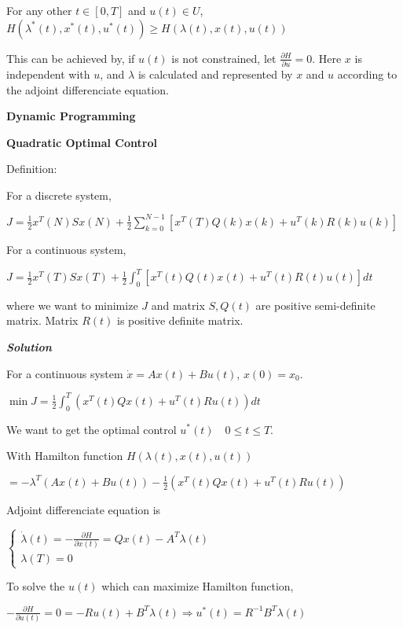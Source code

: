 \documentclass{article}
\newcommand{\bigtitle}[1]{
	\noindent
	\textbf{#1}
}
\newcommand{\smalltitle}[1]{
	\noindent
	\textbf{\textit{#1}}
}
\begin{document}
\begin{spacing}{1.2}
For any other $t \in [0, T]$ and $u(t) \in U$,
$H\left(\lambda^{*}(t), x^{*}(t), u^{*}(t)\right) \geq H\left(\lambda(t), x(t), u(t)\right)$

This can be achieved by, if $u(t)$ is not constrained, let $\frac{\partial H}{\partial u} = 0$. Here $x$ is independent with $u$, and $\lambda$ is calculated and represented by $x$ and $u$ according to the adjoint differenciate equation.



\bigtitle{Dynamic Programming}



\bigtitle{Quadratic Optimal Control}

Definition:

For a discrete system,

\noindent
$J=\frac{1}{2} x^{T}(N) S x(N)+\frac{1}{2} \sum_{k=0}^{N-1}\left[x^{T}(T) Q(k) x(k)+u^{T}(k) R(k) u(k)\right]$

For a continuous system,

\noindent
$J=\frac{1}{2} x^{T}(T) S x(T)+\frac{1}{2} \int_{0}^{T}\left[x^{T}(t) Q(t) x(t)+u^{T}(t) R(t) u(t)\right] d t$

where we want to minimize $J$ and matrix $S, Q(t)$ are positive semi-definite matrix. Matrix $R(t)$ is positive definite matrix.

\smalltitle{Solution}

For a continuous system $\dot{x}=A x(t)+B u(t)$, $x(0) = x_0$.

$\min J=\frac{1}{2} \int_{0}^{T}\left(x^{T}(t) Q x(t)+u^{T}(t) R u(t)\right) d t$

We want to get the optimal control $u^{*}(t) \quad 0 \leq t \leq T$.

With Hamilton function $H(\lambda(t), x(t), u(t))$

$=-\lambda^{T}(A x(t)+B u(t))-\frac{1}{2}\left(x^{T}(t) Q x(t)+u^{T}(t) R u(t)\right)$

Adjoint differenciate equation is 

$
\left\lbrace \begin{array}{ll}
\dot{\lambda}(t) = -\frac{\partial H}{\partial x(t)}=Q x(t)-A^{T} \lambda(t)\\
\lambda(T)=0
\end{array}
\right.
$

To solve the $u(t)$ which can maximize Hamilton function, 

$-\frac{\partial H}{\partial u(t)}=0=-R u(t)+B^{T} \lambda(t) \Rightarrow u^{*}(t)=R^{-1} B^{T} \lambda(t)$


\end{spacing}
\end{document}
